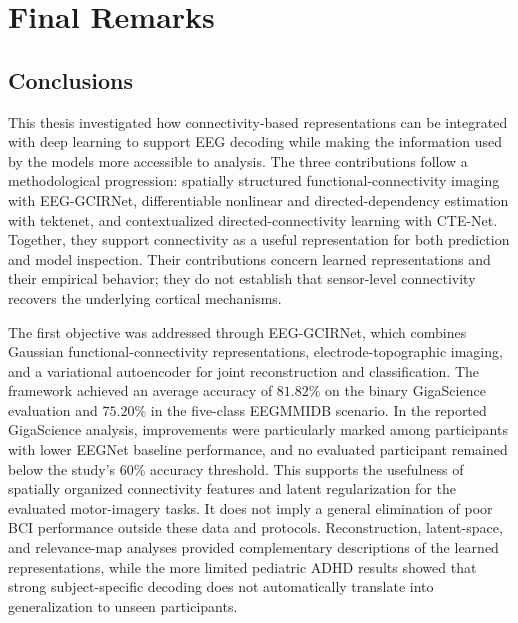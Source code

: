 \chapter{Final Remarks}


\section{Conclusions}
This thesis investigated how connectivity-based representations can be integrated with deep learning to support EEG decoding while making the information used by the models more accessible to analysis. The three contributions follow a methodological progression: spatially structured functional-connectivity imaging with EEG-GCIRNet, differentiable nonlinear and directed-dependency estimation with \gls{tektenet}, and contextualized directed-connectivity learning with CTE-Net. Together, they support connectivity as a useful representation for both prediction and model inspection. Their contributions concern learned representations and their empirical behavior; they do not establish that sensor-level connectivity recovers the underlying cortical mechanisms.

The first objective was addressed through EEG-GCIRNet, which combines Gaussian functional-connectivity representations, electrode-topographic imaging, and a variational autoencoder for joint reconstruction and classification. The framework achieved an average accuracy of $81.82\%$ on the binary GigaScience evaluation and $75.20\%$ in the five-class EEGMMIDB scenario. In the reported GigaScience analysis, improvements were particularly marked among participants with lower EEGNet baseline performance, and no evaluated participant remained below the study's $60\%$ accuracy threshold. This supports the usefulness of spatially organized connectivity features and latent regularization for the evaluated motor-imagery tasks. It does not imply a general elimination of poor BCI performance outside these data and protocols. Reconstruction, latent-space, and relevance-map analyses provided complementary descriptions of the learned representations, while the more limited pediatric ADHD results showed that strong subject-specific decoding does not automatically translate into generalization to unseen participants.

